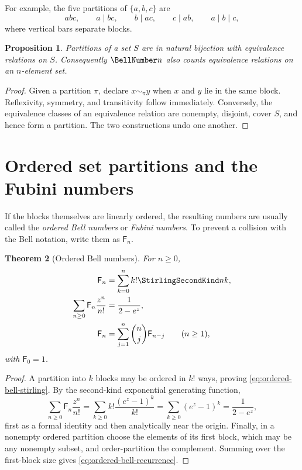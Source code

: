 \documentclass[11pt,a4paper,oneside,openany]{book}
\newtheorem{theorem}{Theorem}[chapter]
\newtheorem{proposition}[theorem]{Proposition}
\theoremstyle{definition}
\theoremstyle{remark}
\begin{document}
For example, the five partitions of $\{a,b,c\}$ are
\[
 abc,\qquad a\mid bc,\qquad b\mid ac,\qquad c\mid ab,\qquad a\mid b\mid c,
\]
where vertical bars separate blocks.

\begin{proposition}
Partitions of a set $S$ are in natural bijection with equivalence relations on $S$.
Consequently $\BellNumber n$ also counts equivalence relations on an $n$-element set.
\end{proposition}
\begin{proof}
Given a partition $\pi$, declare $x\sim_\pi y$ when $x$ and $y$ lie in the same
block.  Reflexivity, symmetry, and transitivity follow immediately.  Conversely,
the equivalence classes of an equivalence relation are nonempty, disjoint, cover
$S$, and hence form a partition.  The two constructions undo one another.
\end{proof}


\section{Ordered set partitions and the Fubini numbers}
If the blocks themselves are linearly ordered, the resulting numbers are usually
called the \emph{ordered Bell numbers} or \emph{Fubini numbers}.  To prevent a
collision with the Bell notation, write them as $\mathsf F_n$.

\begin{theorem}[Ordered Bell numbers]
\label{thm:ordered-bell}
For $n\ge0$,
\begin{align}
 \mathsf F_n&=\sum_{k=0}^{n}k!\StirlingSecondKind nk,
 \label{eq:ordered-bell-stirling}\\
 \sum_{n\ge0}\mathsf F_n\frac{z^n}{n!}
 &=\frac{1}{2-e^z},
 \label{eq:ordered-bell-egf}\\
 \mathsf F_n&=\sum_{j=1}^{n}\binom nj\mathsf F_{n-j}
 \qquad(n\ge1),
 \label{eq:ordered-bell-recurrence}
\end{align}
with $\mathsf F_0=1$.
\end{theorem}
\begin{proof}
A partition into $k$ blocks may be ordered in $k!$ ways, proving
\eqref{eq:ordered-bell-stirling}.  By the second-kind exponential generating
function,
\[
 \sum_{n\ge0}\mathsf F_n\frac{z^n}{n!}
 =\sum_{k\ge0}k!\frac{(e^z-1)^k}{k!}
 =\sum_{k\ge0}(e^z-1)^k
 =\frac1{2-e^z},
\]
first as a formal identity and then analytically near the origin.  Finally, in a
nonempty ordered partition choose the elements of its first block, which may be any
nonempty subset, and order-partition the complement.  Summing over the first-block
size gives \eqref{eq:ordered-bell-recurrence}.
\end{proof}
\end{document}
